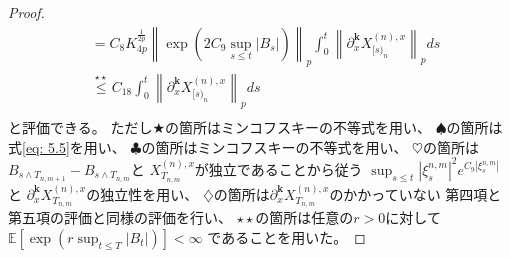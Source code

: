 \documentclass[uplatex]{jsarticle}
\theoremstyle{definition}
\def\E{\mathbb{E}}
\begin{document}
\begin{proof}
\begin{align*}
    &= C_8 K_{4p}^{\frac{1}{2p}}
    \left\| \exp\left( 2C_9\sup_{s\leq t}|B_s|\right) \right\|_p
    \int_0^t \left\| \partial_x^{\mathbf{k}}X_{[s)_n}^{(n),x} \right\|_p ds \\
    &\overset{\star\star}{\leq} C_{18}
    \int_0^t \left\| \partial_x^{\mathbf{k}}X_{[s)_n}^{(n),x} \right\|_p ds \\
  \end{align*}
  と評価できる。
  ただし\(\bigstar\)の箇所はミンコフスキーの不等式を用い、
  \(\spadesuit\)の箇所は式\eqref{eq: 5.5}を用い、
  \(\clubsuit\)の箇所はミンコフスキーの不等式を用い、
  \(\heartsuit\)の箇所は\(B_{s\wedge T_{n,m+1}} - B_{s\wedge T_{n,m}}\)と
  \(X_{T_{n,m}}^{(n),x}\)が独立であることから従う
  \(\sup_{s\leq t} |\xi_s^{n,m}|^2 e^{C_9|\xi_s^{n,m}|}\)と
  \(\partial_x^{\mathbf{k}}X_{T_{n,m}}^{(n),x}\)の独立性を用い、
  \(\diamondsuit\)の箇所は\(\partial_x^{\mathbf{k}}X_{T_{n,m}}^{(n),x}\)のかかっていない
  第四項と第五項の評価と同様の評価を行い、
  \(\star\star\)の箇所は任意の\(r>0\)に対して
  \(\E\left[ \exp\left( r\sup_{t\leq T}|B_t|\right)\right]< \infty\)
  であることを用いた。


\end{proof}
\end{document}
